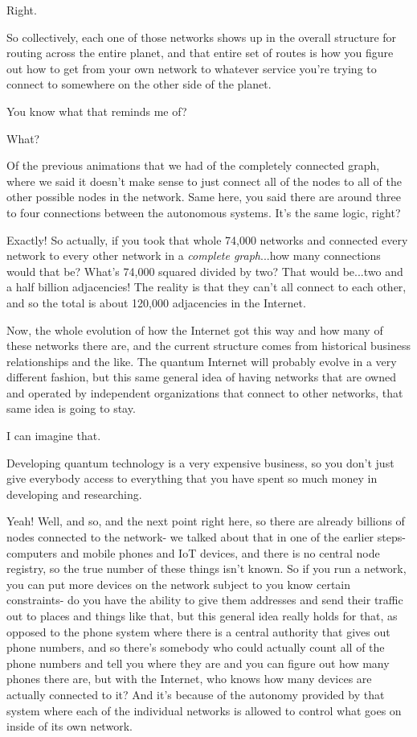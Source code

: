 \mmm Right.

\rrr So collectively, each one of those networks shows up in the overall structure for routing across the entire planet, and that entire set of routes is how you figure out how to get from your own network to whatever service you're trying to connect to somewhere on the other side of the planet.

\mmm You know what that reminds me of? 

\rrr What?

\mmm Of the previous animations that we had of the completely connected graph, where we said it doesn't make sense to just connect all of the nodes to all of the other possible nodes in the network. Same here, you said there are around three to four connections between the autonomous systems. It's the same logic, right?

\rrr Exactly! So actually, if you took that whole 74,000 networks and connected every network to every other network in a \emph{complete graph}...how many connections would that be?  What's 74,000 squared divided by two? That would be...two and a half billion adjacencies!  The reality is that they can't all connect to each other, and so the total is about 120,000 adjacencies in the Internet.

Now, the whole evolution of how the Internet got this way and how many of these networks there are, and the current structure comes from historical business relationships and the like. The quantum Internet will probably evolve in a very different fashion, but this same general idea of having networks that are owned and operated by independent organizations that connect to other networks, that same idea is going to stay.

\mmm I can imagine that.

Developing quantum technology is a very expensive business, so you don't just give everybody access to everything that you have spent so much money in developing and researching.

\rrr Yeah! Well, and so, and the next point right here, so there are already billions of nodes connected to the network- we talked about that in one of the earlier steps- computers and mobile phones and IoT devices, and there is no central node registry, so the true number of these things isn't known. So if you run a network, you can put more devices on the network subject to you know certain constraints- do you have the ability to give them addresses and send their traffic out to places and things like that, but this general idea really holds for that, as opposed to the phone system where there is a central authority that gives out phone numbers, and so there's somebody who could actually count all of the phone numbers and tell you where they are and you can figure out how many phones there are, but with the Internet, who knows how many devices are actually connected to it? And it's because of the autonomy provided by that system where each of the individual networks is allowed to control what goes on inside of its own network.

